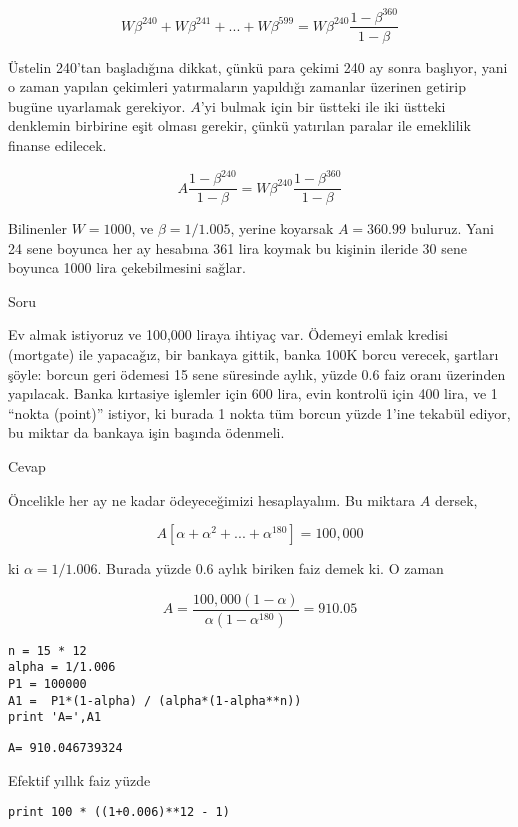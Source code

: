 \documentclass[12pt,fleqn]{article}\usepackage{../../common}
\begin{document}
$$
W\beta^{240} + W\beta^{241} + ... +  W\beta^{599} =
W\beta^{240} \frac{1-\beta^{360}}{1-\beta}
$$

Üstelin 240'tan başladığına dikkat, çünkü para çekimi  240 ay sonra başlıyor,
yani o zaman yapılan çekimleri yatırmaların yapıldığı zamanlar üzerinen getirip
bugüne uyarlamak gerekiyor. $A$'yi bulmak için bir üstteki ile iki üstteki
denklemin birbirine eşit olması gerekir, çünkü yatırılan paralar ile emeklilik
finanse edilecek. 

$$
A \frac{1-\beta^{240}}{1-\beta} =
W\beta^{240} \frac{1-\beta^{360}}{1-\beta}$$

Bilinenler $W=1000$, ve $\beta = 1/1.005$, yerine koyarsak $A=360.99$
buluruz. Yani 24 sene boyunca her ay hesabına 361 lira koymak bu kişinin ileride
30 sene boyunca 1000 lira çekebilmesini sağlar. 

Soru

Ev almak istiyoruz ve 100,000 liraya ihtiyaç var. Ödemeyi emlak kredisi
(mortgate) ile yapacağız, bir bankaya gittik, banka 100K borcu verecek, şartları
şöyle: borcun geri ödemesi 15 sene süresinde aylık, yüzde 0.6 faiz oranı
üzerinden yapılacak. Banka kırtasiye işlemler için 600 lira, evin kontrolü için
400 lira, ve 1 ``nokta (point)'' istiyor, ki burada 1 nokta tüm borcun yüzde
1'ine tekabül ediyor, bu miktar da bankaya işin başında ödenmeli.

Cevap

Öncelikle her ay ne kadar ödeyeceğimizi hesaplayalım. Bu miktara $A$ dersek,

$$ A [\alpha + \alpha^2 + ... + \alpha^{180}] = 100,000 $$

ki $\alpha = 1/1.006$. Burada yüzde 0.6 aylık biriken faiz demek ki. O zaman

$$ A = \frac{100,000(1-\alpha)}{\alpha (1-\alpha^{180})} = 910.05 $$

\begin{verbatim}
n = 15 * 12
alpha = 1/1.006
P1 = 100000
A1 =  P1*(1-alpha) / (alpha*(1-alpha**n))
print 'A=',A1
\end{verbatim}

\begin{verbatim}
A= 910.046739324
\end{verbatim}

Efektif yıllık faiz yüzde

\begin{verbatim}
print 100 * ((1+0.006)**12 - 1)
\end{verbatim}
\end{document}
